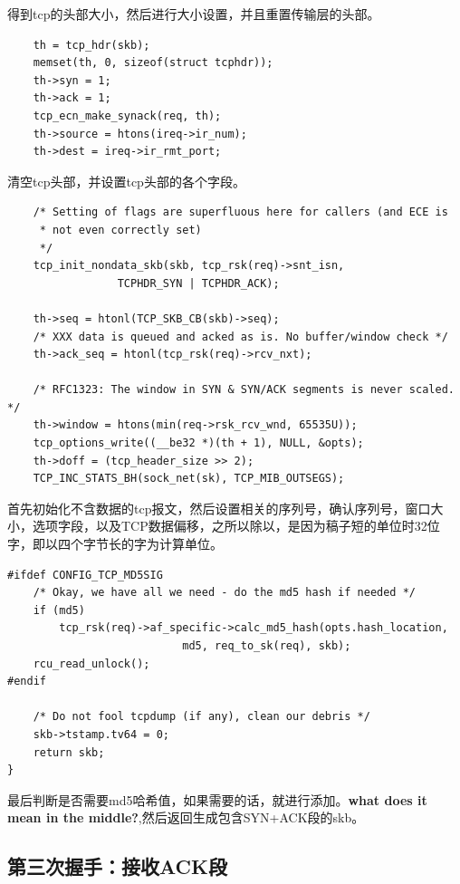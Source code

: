                 得到tcp的头部大小，然后进行大小设置，并且重置传输层的头部。

\begin{verbatim}
    th = tcp_hdr(skb);
    memset(th, 0, sizeof(struct tcphdr));
    th->syn = 1;
    th->ack = 1;
    tcp_ecn_make_synack(req, th);
    th->source = htons(ireq->ir_num);
    th->dest = ireq->ir_rmt_port;
\end{verbatim}

                清空tcp头部，并设置tcp头部的各个字段。

\begin{verbatim}
    /* Setting of flags are superfluous here for callers (and ECE is
     * not even correctly set)
     */
    tcp_init_nondata_skb(skb, tcp_rsk(req)->snt_isn,
                 TCPHDR_SYN | TCPHDR_ACK);

    th->seq = htonl(TCP_SKB_CB(skb)->seq);
    /* XXX data is queued and acked as is. No buffer/window check */
    th->ack_seq = htonl(tcp_rsk(req)->rcv_nxt);

    /* RFC1323: The window in SYN & SYN/ACK segments is never scaled. */
    th->window = htons(min(req->rsk_rcv_wnd, 65535U));
    tcp_options_write((__be32 *)(th + 1), NULL, &opts);
    th->doff = (tcp_header_size >> 2);
    TCP_INC_STATS_BH(sock_net(sk), TCP_MIB_OUTSEGS);
\end{verbatim}

                首先初始化不含数据的tcp报文，然后设置相关的序列号，确认序列号，窗口大小，选项字段，以及TCP数据偏移，之所以除以，是因为稿子短的单位时32位字，即以四个字节长的字为计算单位。
                
\begin{verbatim}
#ifdef CONFIG_TCP_MD5SIG
    /* Okay, we have all we need - do the md5 hash if needed */
    if (md5)
        tcp_rsk(req)->af_specific->calc_md5_hash(opts.hash_location,
                           md5, req_to_sk(req), skb);
    rcu_read_unlock();
#endif

    /* Do not fool tcpdump (if any), clean our debris */
    skb->tstamp.tv64 = 0;
    return skb;
}
\end{verbatim}

                最后判断是否需要md5哈希值，如果需要的话，就进行添加。\textbf{what does it mean in the middle?},然后返回生成包含SYN+ACK段的skb。     

        \subsection{第三次握手：接收ACK段}

